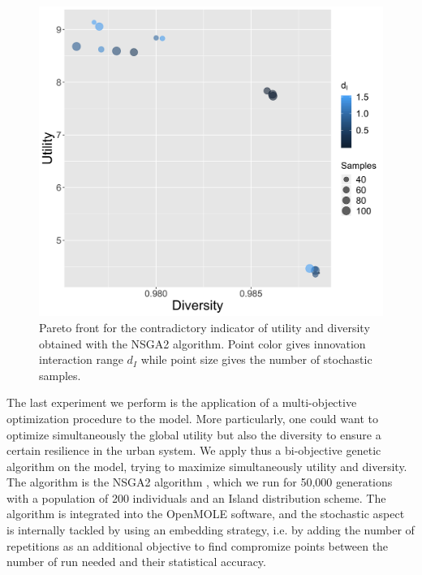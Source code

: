 \documentclass[letterpaper]{article}
\begin{document}
\begin{figure}[t]
	\centering
	\includegraphics[width=\linewidth]{figures/paretoDiversity-Utility_colorinnovationDecay.png}
	\caption{Pareto front for the contradictory indicator of utility and diversity obtained with the NSGA2 algorithm. Point color gives innovation interaction range $d_I$ while point size gives the number of stochastic samples.\label{fig:pareto}}
\end{figure}

The last experiment we perform is the application of a multi-objective optimization procedure to the model. More particularly, one could want to optimize simultaneously the global utility but also the diversity to ensure a certain resilience in the urban system. We apply thus a bi-objective genetic algorithm on the model, trying to maximize simultaneously utility and diversity. The algorithm is the NSGA2 algorithm \citep{deb2002fast}, which we run for 50,000 generations with a population of 200 individuals and an Island distribution scheme. The algorithm is integrated into the OpenMOLE software, and the stochastic aspect is internally tackled by using an embedding strategy, i.e. by adding the number of repetitions as an additional objective to find compromize points between the number of run needed and their statistical accuracy.
\end{document}
